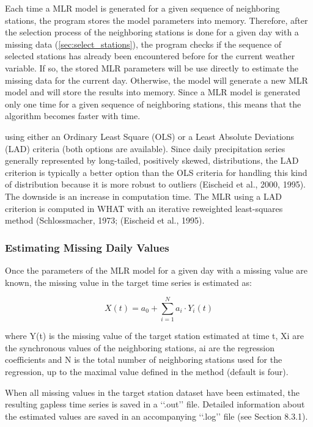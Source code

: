 \documentclass[TechnicalNoteMeteo.tex]{subfiles}
\begin{document}
Each time a MLR model is generated for a given sequence of neighboring stations, the program stores the model parameters into memory. Therefore, after the selection process of the neighboring stations is done for a given day with a missing data (\cref{sec:select_stations}), the program checks if the sequence of selected stations has already been encountered before for the current weather variable. If so, the stored MLR parameters will be use directly to estimate the missing data for the current day. Otherwise, the model will generate a new MLR model and will store the results into memory. Since a MLR model is generated only one time for a given sequence of neighboring stations, this means that the algorithm becomes faster with time.



using either an Ordinary Least Square (OLS) or a Least Absolute Deviations (LAD) criteria (both options are available). Since daily precipitation series generally represented by long-tailed, positively skewed, distributions, the LAD criterion is typically a better option than the OLS criteria for handling this kind of distribution because it is more robust to outliers (Eischeid et al., 2000, 1995). The downside is an increase in computation time. The MLR using a LAD criterion is computed in WHAT with an iterative reweighted least-squares method (Schlossmacher, 1973; (Eischeid et al., 1995).


\subsubsection{Estimating Missing Daily Values}

Once the parameters of the MLR model for a given day with a missing value are known, the missing value in the target time series is estimated as:

\begin{equation}
    X(t) = a_0 + \sum_{i=1}^{N} a_i \cdot Y_i(t)
\end{equation}

where Y(t) is the missing value of the target station estimated at time t, Xi are the synchronous values of the neighboring stations, ai are the regression coefficients and N is the total number of neighboring stations used for the regression, up to the maximal value defined in the method (default is four).

When all missing values in the target station dataset have been estimated, the resulting gapless time series is saved in a ‘‘.out’’ file. Detailed information about the estimated values are saved in an accompanying ‘‘.log’’ file (see Section 8.3.1).
\end{document}

